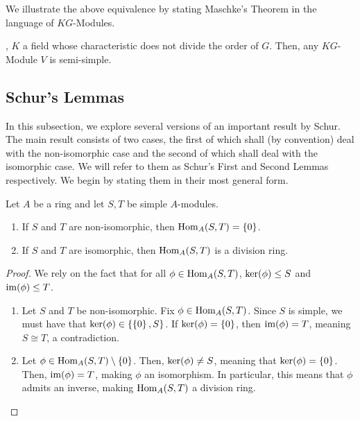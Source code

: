 We illustrate the above equivalence by stating Maschke's Theorem in the language of $KG$-Modules.

\begin{lemma}
    , $K$ a field whose characteristic does not divide the order of $G$. Then, any $KG$-Module $V$ is semi-simple.
\end{lemma}

\subsection{Schur's Lemmas}

In this subsection, we explore several versions of an important result by Schur. The main result consists of two cases, the first of which shall (by convention) deal with the non-isomorphic case and the second of which shall deal with the isomorphic case. We will refer to them as Schur's First and Second Lemmas respectively. We begin by stating them in their most general form.

\begin{theorem}
    Let $A$ be a ring and let $S, T$ be simple $A$-modules.
    \begin{enumerate}[label = \normalfont \arabic*., noitemsep]
        \item If $S$ and $T$ are non-isomorphic, then $\operatorname{Hom}_A(S, T) = \left\{ 0 \right\}$.
        \item If $S$ and $T$ are isomorphic, then $\operatorname{Hom}_A(S,T)$ is a division ring.
    \end{enumerate}
\end{theorem}
\begin{proof}
    We rely on the fact that for all $\phi \in \operatorname{Hom}_A(S, T)$, $\operatorname{ker}\!\left( \phi \right) \leq S$ and $\operatorname{im}\!\left( \phi \right) \leq T$.
    \begin{enumerate}
        \item Let $S$ and $T$ be non-isomorphic. Fix $\phi \in \operatorname{Hom}_A(S,T)$. Since $S$ is simple, we must have that $\operatorname{ker}\!\left( \phi \right) \in \left\{ \left\{ 0 \right\}, S \right\}$. If $\operatorname{ker}\!\left( \phi \right) = \left\{ 0 \right\}$, then $\operatorname{im}\!\left( \phi \right) = T$, meaning $S \cong T$, a contradiction.
        \item Let $\phi \in \operatorname{Hom}_A(S,T) \setminus \left\{ 0 \right\}$. Then, $\operatorname{ker}\!\left( \phi \right) \neq S$, meaning that $\operatorname{ker}\!\left( \phi \right) = \left\{ 0 \right\}$. Then, $\operatorname{im}\!\left( \phi \right) = T$, making $\phi$ an isomorphism. In particular, this means that $\phi$ admits an inverse, making $\operatorname{Hom}_A(S,T)$ a division ring.
    \end{enumerate}
\end{proof}

